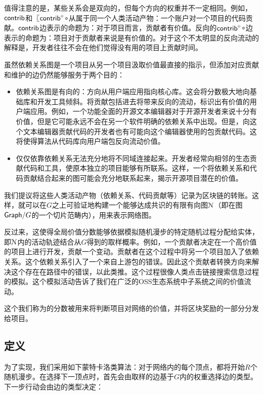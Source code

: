 \noindent 值得注意的是，某些关系会是双向的，但每个方向的权重并不一定相同。例如，$\mathsf{contrib}$和〖$\mathsf{contrib}^\circ$∘从属于同一个人类活动产物：一个账户对一个项目的代码贡献。$\mathsf{contrib}$边表示的命题为：对于项目而言，贡献者有价值。反向的$\mathsf{contrib}^\circ$∘边表示的命题为：项目对于贡献者来说是有价值的。对于这个不太明显的反向流动的解释是，开发者往往不会在他们觉得没有用的项目上贡献时间。


虽然依赖关系图是一个项目从另一个项目汲取价值最直接的指示，但添加对应贡献和维护的边仍然能够服务于两个目的：
\begin{itemize}
\item 依赖关系图是有向的：方向从用户端应用指向核心库。这会将分数极大地向基础库和开发工具倾斜。将贡献包括进去将带来反向的流动，标识出有价值的用户端应用。例如，一个功能全面的开源文本编辑器对于开源开发者来说十分有价值，但是它可能永远不会在另一个软件明确的依赖关系中出现。但是，向这个文本编辑器贡献代码的开发者也有可能向这个编辑器使用的包贡献代码。这将使得算法从代码库向用户端包反向流动价值。
\item 仅仅依靠依赖关系无法充分地将不同域连接起来。开发者经常向相邻的生态贡献代码和工具，使原本独立的项目能够有所联系。这样，一个将依赖关系和代码贡献结合起来的图可能会充分地联系起来，揭示开源项目潜在的价值。
\end{itemize}
我们提议将这些人类活动产物（依赖关系、代码贡献等）记录为区块链的转账。这样，就可以在$G$之上可验证地构建一个能够达成共识的有限有向图$\mathcal{N}$（即在图$\mathsf{Graph}/G$的一个切片范畴内），用来表示\oscoin{}网络图。

反过来，这使得全局价值分数能够依据模拟随机漫步的特定随机过程分配给实体，即$\mathcal{N}$内的活动轨迹结合从$G$得到的取样概率。例如，一个贡献者决定在一个高价值的项目上进行开发，贡献一个变动。贡献者在这个过程中将另一个项目加入了依赖关系。这个依赖关系引入了一个来自上游包的错误。因此这个贡献者转换方向来解决这个存在在路径中的错误，以此类推。这个过程很像人类点击链接搜索信息过程的模拟。这个模拟活动告诉了我们在广泛的OSS生态系统中子系统之间的价值流动。

这个我们称为\osrank{}的分数被用来将判断项目对\oscoin{}网络的价值，并将区块奖励的一部分分发给项目。

\subsection{定义}

为了实现\osrank{}，我们采用如下蒙特卡洛类算法：对于网络内的每个顶点，都将开始$R$个随机漫步。在选择下一顶点时，首先会由取样的边基于$G$内的权重选择边的类型。下一步行动会由边的类型决定：

